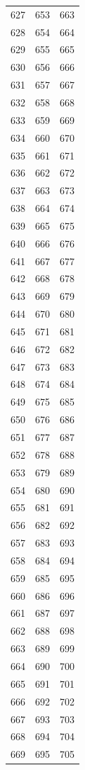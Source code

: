 \begin{tabular}{rrr}
  627 & 653 & 663 \\
  628 & 654 & 664 \\
  629 & 655 & 665 \\
  630 & 656 & 666 \\
  631 & 657 & 667 \\
  632 & 658 & 668 \\
  633 & 659 & 669 \\
  634 & 660 & 670 \\
  635 & 661 & 671 \\
  636 & 662 & 672 \\
  637 & 663 & 673 \\
  638 & 664 & 674 \\
  639 & 665 & 675 \\
  640 & 666 & 676 \\
  641 & 667 & 677 \\
  642 & 668 & 678 \\
  643 & 669 & 679 \\
  644 & 670 & 680 \\
  645 & 671 & 681 \\
  646 & 672 & 682 \\
  647 & 673 & 683 \\
  648 & 674 & 684 \\
  649 & 675 & 685 \\
  650 & 676 & 686 \\
  651 & 677 & 687 \\
  652 & 678 & 688 \\
  653 & 679 & 689 \\
  654 & 680 & 690 \\
  655 & 681 & 691 \\
  656 & 682 & 692 \\
  657 & 683 & 693 \\
  658 & 684 & 694 \\
  659 & 685 & 695 \\
  660 & 686 & 696 \\
  661 & 687 & 697 \\
  662 & 688 & 698 \\
  663 & 689 & 699 \\
  664 & 690 & 700 \\
  665 & 691 & 701 \\
  666 & 692 & 702 \\
  667 & 693 & 703 \\
  668 & 694 & 704 \\
  669 & 695 & 705 \\

\end{tabular}
